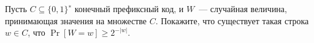 Пусть $C \subseteq \{0, 1\}^∗$ конечный префиксный код, и $W$~--- случайная величина, принимающая
значения на множестве $C$. Покажите, что существует такая строка $w \in C$, что $\Pr[W = w] \ge
2^{-|w|}$.